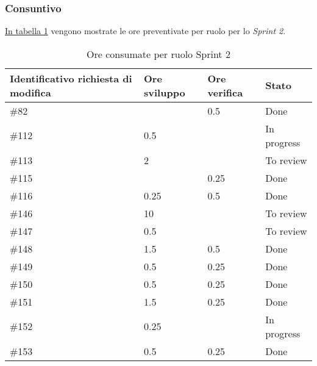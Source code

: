 \subsubsection{Consuntivo}

\hyperref[tab:sprint2_ore_consumate]{In tabella \ref{tab:sprint2_ore_consumate}} vengono mostrate le ore preventivate per ruolo per lo \textit{Sprint 2}.

\begin{table}[!h]
    \centering
        \begin{tabular}{| l | l | l | l |}
            \hline
                \textbf{Identificativo richiesta di modifica} & 
                \textbf{Ore sviluppo} &
                \textbf{Ore verifica} & 
                \textbf{Stato}\\ 
    \hline
        \#82 &  & 0.5 & Done \\
    \hline
        \#112 & 0.5 &  & In progress \\
    \hline
        \#113 & 2 &  & To review \\
    \hline
        \#115 &  & 0.25 & Done \\
    \hline
        \#116 & 0.25 & 0.5 & Done \\
    \hline
        \#146 & 10 &  & To review \\
    \hline
        \#147 & 0.5 & & To review \\
    \hline
        \#148 & 1.5 & 0.5 & Done \\
    \hline
        \#149 & 0.5 & 0.25 & Done \\
    \hline
        \#150 & 0.5 & 0.25 & Done \\
     \hline
        \#151 & 1.5 & 0.25 & Done \\
    \hline
        \#152 & 0.25 &  & In progress \\
    \hline
        \#153 & 0.5 & 0.25 & Done \\
    \hline
    \end{tabular}
    \caption{Ore consumate per ruolo Sprint 2}
    \label{tab:sprint2_ore_consumate} 
\end{table}